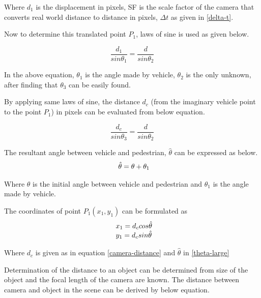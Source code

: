 Where ${d_1}$ is the displacement in pixels, SF is the scale factor of the camera that converts real world distance to distance in pixels, $\Delta t$ as given in \ref{delta-t}.

Now to determine this translated point ${P_1}$, laws of sine is used as given below. 

\begin{equation}
\frac{d_1}{sin \theta_1} = \frac{d}{sin \theta_2} 
\end{equation}

In the above equation, $\theta_1$ is the angle made by vehicle, $\theta_2$ is the only unknown, after finding that $\theta_3$ can be easily found.

By applying same laws of sine, the distance $d_c$ (from the imaginary vehicle point to the point $P_1$) in pixels can be evaluated from below equation.

\begin{equation} \label{camera-distance}
\frac{d_c}{sin \theta_3} = \frac{d}{sin \theta_2} 
\end{equation} 


The resultant angle between vehicle and pedestrian, ${\hat{\theta}}$ can be expressed as below.
\begin{equation} \label{theta-large}
\begin{array}{l@{}}
\hat{\theta } = \theta  + {\theta}_1
\end{array}			
\end{equation} 

Where ${\theta}$ is the initial angle between vehicle and pedestrian and ${{\theta}_1}$ is the angle made by vehicle.

The coordinates of point ${P_1(x_1, y_1)}$ can be formulated as
\begin{equation}
\begin{array}{l@{}} 
x_1 = d_c cos \hat{\theta } \\
y_1 = d_c sin \hat{\theta } 
\end{array}			
\end{equation} 

Where $d_c$ is given as in equation \ref{camera-distance} and $\hat{\theta}$ in \ref{theta-large}

Determination of the distance to an object \cite{jungel2007improving} can be determined from size of the object and the focal length of the camera are known.
The distance between camera and object in the scene can be derived by below equation.

